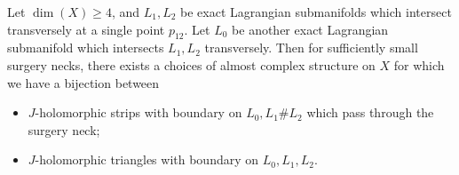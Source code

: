 

    Let $\dim(X)\geq 4$, and $L_1, L_2$ be exact Lagrangian submanifolds which intersect transversely at a single point $p_{12}$. Let $L_0$ be another exact Lagrangian submanifold which intersects $L_1, L_2$ transversely. Then for sufficiently small surgery necks, there exists a choices of almost complex structure on $X$ for which we have a bijection between
    \begin{itemize}
        \item $J$-holomorphic strips with boundary on $L_0, L_1\# L_2$ which pass through the surgery neck;
        \item $J$-holomorphic triangles with boundary on $L_0, L_1, L_2$.
    \end{itemize}
